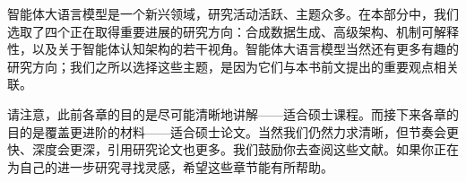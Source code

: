 智能体大语言模型是一个新兴领域，研究活动活跃、主题众多。在本部分中，我们选取了四个正在取得重要进展的研究方向：合成数据生成、高级架构、机制可解释性，以及关于智能体认知架构的若干视角。智能体大语言模型当然还有更多有趣的研究方向；我们之所以选择这些主题，是因为它们与本书前文提出的重要观点相关联。 

请注意，此前各章的目的是尽可能清晰地讲解——适合硕士课程。而接下来各章的目的是覆盖更进阶的材料——适合硕士论文。当然我们仍然力求清晰，但节奏会更快、深度会更深，引用研究论文也更多。我们鼓励你去查阅这些文献。如果你正在为自己的进一步研究寻找灵感，希望这些章节能有所帮助。
